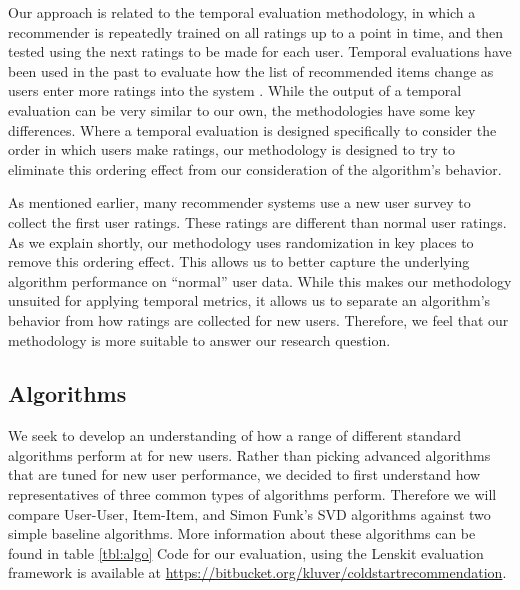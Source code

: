 \documentclass[letterpaper]{sig-alternate}
\begin{document}
  Our approach is related to the temporal evaluation methodology, in which a recommender is repeatedly trained on all ratings up to a point in time, and then tested using the next ratings to be made for each user.
  Temporal evaluations have been used in the past to evaluate how the list of recommended items change as users enter more ratings into the system \cite{LathiaTemporal}.
  While the output of a temporal evaluation can be very similar to our own, the methodologies have some key differences.
  Where a temporal evaluation is designed specifically to consider the order in which users make ratings, our methodology is designed to try to eliminate this ordering effect from our consideration of the algorithm's behavior.

  As mentioned earlier, many recommender systems use a new user survey to collect the first user ratings.
  These ratings are different than normal user ratings.
  As we explain shortly, our methodology uses randomization in key places to remove this ordering effect.
  This allows us to better capture the underlying algorithm performance on ``normal'' user data.
  While this makes our methodology unsuited for applying temporal metrics, it allows us to separate an algorithm's behavior from how ratings are collected for new users.
  Therefore, we feel that our methodology is more suitable to answer our research question.

  \subsection*{Algorithms}

  We seek to develop an understanding of how a range of different standard algorithms perform at for new users.
  Rather than picking advanced algorithms that are tuned for new user performance, we decided to first understand how representatives of three common types of algorithms perform.
  Therefore we will compare User-User\cite{resnick1994grouplens}, Item-Item\cite{sarwar2001item}, and Simon Funk's SVD\cite{funk_netflix_2006} algorithms against two simple baseline algorithms.
  More information about these algorithms can be found in table \ref{tbl:algo}
  Code for our evaluation, using the Lenskit evaluation framework \cite{lenskit} is available at \url{https://bitbucket.org/kluver/coldstartrecommendation}.
  
\end{document}
